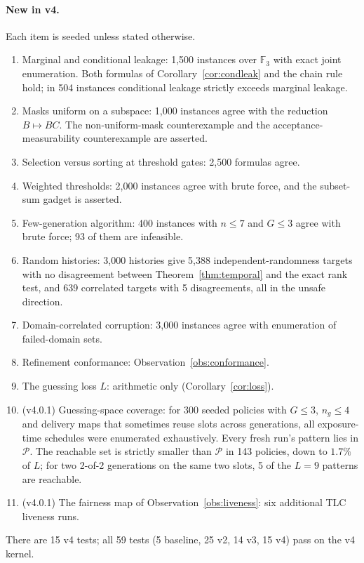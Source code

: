 \documentclass[pdflatex,sn-mathphys-num]{sn-jnl}
\theoremstyle{plain}
\theoremstyle{definition}
\newcommand{\F}{\mathbb{F}}
\begin{document}
\paragraph{New in v4.}
Each item is seeded unless stated otherwise.
\begin{enumerate}
\item Marginal and conditional leakage: 1,500 instances over $\F_3$ with exact joint enumeration. Both formulas of Corollary~\ref{cor:condleak} and the chain rule hold; in 504 instances conditional leakage strictly exceeds marginal leakage.
\item Masks uniform on a subspace: 1,000 instances agree with the reduction $B\mapsto BC$. The non-uniform-mask counterexample and the acceptance-measurability counterexample are asserted.
\item Selection versus sorting at threshold gates: 2,500 formulas agree.
\item Weighted thresholds: 2,000 instances agree with brute force, and the subset-sum gadget is asserted.
\item Few-generation algorithm: 400 instances with $n\le7$ and $G\le3$ agree with brute force; 93 of them are infeasible.
\item Random histories: 3,000 histories give 5,388 independent-randomness targets with no disagreement between Theorem~\ref{thm:temporal} and the exact rank test, and 639 correlated targets with 5 disagreements, all in the unsafe direction.
\item Domain-correlated corruption: 3,000 instances agree with enumeration of failed-domain sets.
\item Refinement conformance: Observation~\ref{obs:conformance}.
\item The guessing loss $L$: arithmetic only (Corollary~\ref{cor:loss}).
\item (v4.0.1) Guessing-space coverage: for 300 seeded policies with $G\le3$, $n_g\le4$ and delivery maps that sometimes reuse slots across generations, all exposure-time schedules were enumerated exhaustively. Every fresh run's pattern lies in $\mathcal P$. The reachable set is strictly smaller than $\mathcal P$ in 143 policies, down to $1.7\%$ of $L$; for two 2-of-2 generations on the same two slots, 5 of the $L=9$ patterns are reachable.
\item (v4.0.1) The fairness map of Observation~\ref{obs:liveness}: six additional TLC liveness runs.
\end{enumerate}
There are 15 v4 tests; all 59 tests (5 baseline, 25 v2, 14 v3, 15 v4) pass on the v4 kernel.
\end{document}
